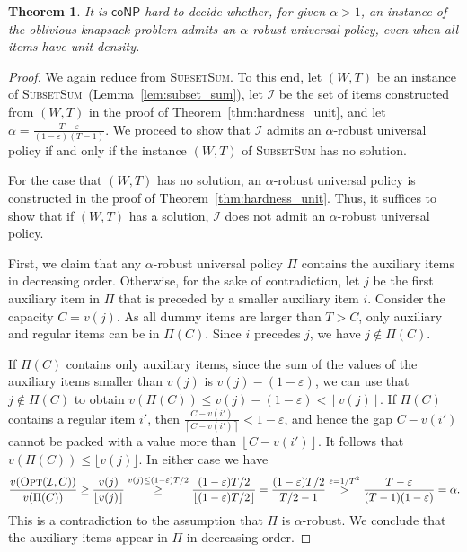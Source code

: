 \documentclass[11pt]{article}
\newtheorem{theorem}{Theorem}
\newcommand{\opt}{\textsc{Opt}}
\newcommand{\OPT}{\opt}
\newcommand{\I}{\mathcal{I}}
\newcommand{\classcoNP}{\mathsf{coNP}}
\renewcommand{\epsilon}{\varepsilon}
\begin{document}
\pagebreak 
\begin{theorem}
It is $\classcoNP$-hard to decide whether, for given $\alpha>1$,
an instance of the oblivious knapsack problem admits an $\alpha$-robust
universal policy, even when all items have unit density.\end{theorem}
\begin{proof}
We again reduce from \textsc{SubsetSum}. To this end, let $(W,T)$
be an instance of \textsc{SubsetSum}~(Lemma~\ref{lem:subset_sum}),
let $\I$ be the set of items constructed from $(W,T)$ in the proof
of Theorem~\ref{thm:hardness_unit}, and let $\alpha=\frac{T-\epsilon}{(1-\epsilon)(T-1)}$.
We proceed to show that $\I$ admits an $\alpha$-robust universal
policy if and only if the instance \textsc{$(W,T)$ }of \textsc{SubsetSum}
has no solution.

For the case that $(W,T)$ has no solution, an $\alpha$-robust universal
policy is constructed in the proof of Theorem~\ref{thm:hardness_unit}.
Thus, it suffices to show that if $(W,T)$ has a solution, $\I$ does
not admit an $\alpha$-robust universal policy.

First, we claim that any $\alpha$-robust universal policy $\Pi$
contains the auxiliary items in decreasing order. Otherwise, for the
sake of contradiction, let $j$ be the first auxiliary item in $\Pi$
that is preceded by a smaller auxiliary item $i$. Consider the capacity
$C=v(j)$. As all dummy items are larger than $T>C$, only auxiliary
and regular items can be in $\Pi(C)$. Since $i$ precedes $j$, we
have $j\notin\Pi(C)$. 

If\emph{ }$\Pi(C)$ contains only auxiliary items, since the sum of
the values of the auxiliary items smaller than $v(j)$ is $v(j)-(1-\epsilon)$,
we can use that $j\notin\Pi(C)$ to obtain $v(\Pi(C))\leq v(j)-(1-\epsilon)<\left\lfloor v(j)\right\rfloor $.
If \emph{$\Pi(C)$} contains a regular item $i'$, then $\frac{C-v(i')}{\left\lceil C-v(i')\right\rceil }<1-\varepsilon$,
and hence the gap $C-v(i')$ cannot be packed with a value more than
$\left\lfloor C-v(i')\right\rfloor $. It follows that $v(\Pi(C))\leq\lfloor v(j)\rfloor$.
In either case we have
\[
\frac{v(\OPT(\I,C))}{v(\Pi(C))}\geq\frac{v(j)}{\lfloor
v(j)\rfloor}\overset{v(j)\leq(1-\varepsilon)T/2}{\geq}\frac{(1-\varepsilon)T/2}{\lfloor(1-\varepsilon)T/2\rfloor}=\frac{
(1-\varepsilon)T/2}{T/2-1}\overset{\varepsilon=1/T^{2}}{>}\frac{T-\epsilon}{(T-1)(1-\epsilon)}=\alpha.
\]
This is a contradiction to the assumption that $\Pi$ is $\alpha$-robust.
We conclude that the auxiliary items appear in $\Pi$ in decreasing
order.


\end{proof}
\end{document}
